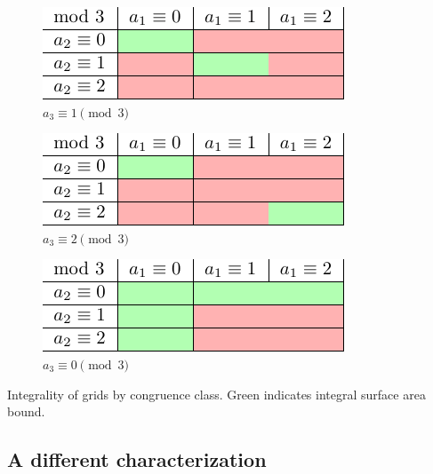 \begin{table}[]
\centering
\begin{subfigure}{0.3\textwidth}
	\includegraphics[width=\textwidth]{tables/1/integral_bounds_thickness_1.pdf}
	\caption{$a_3 \equiv 1 \pmod 3$}
	\label{tab:integral_bounds_a}
\end{subfigure} \hfill%
\begin{subfigure}{0.3\textwidth}
	\includegraphics[width=\textwidth]{tables/1/integral_bounds_thickness_2.pdf}
	\caption{$a_3 \equiv 2 \pmod 3$}
	\label{tab:integral_bounds_b}
\end{subfigure} \hfill%
\begin{subfigure}{0.3\textwidth}
	\includegraphics[width=\textwidth]{tables/1/integral_bounds_thickness_3.pdf}
	\caption{$a_3 \equiv 0 \pmod 3$}
	\label{tab:integral_bounds_c}
\end{subfigure}
\caption{Integrality of grids by congruence class. Green indicates integral surface area bound.}
\label{tab:integral_bounds}
\end{table} 

\subsection{A different characterization}


